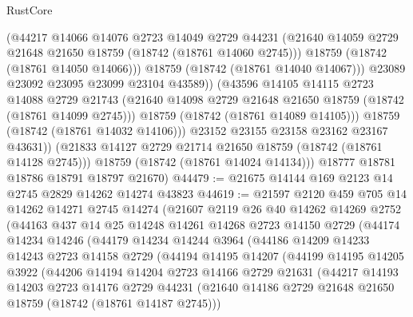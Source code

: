 \begin{lexlean}{RustCore}
\begin{coremodule}
                    (@44217
                      @14066
                      @14076
                      @2723
                      @14049
                      @2729
                      @44231
                      (@21640 @14059 @2729 @21648 @21650 @18759 (@18742 (@18761 @14060 @2745)))
                      @18759
                      (@18742 (@18761 @14050 @14066)))
                    @18759
                    (@18742 (@18761 @14040 @14067)))
                  @23089
                  @23092
                  @23095
                  @23099
                  @23104
                  @43589))
              (@43596
                @14105
                @14115
                @2723
                @14088
                @2729
                @21743
                (@21640 @14098 @2729 @21648 @21650 @18759 (@18742 (@18761 @14099 @2745)))
                @18759
                (@18742 (@18761 @14089 @14105)))
              @18759
              (@18742 (@18761 @14032 @14106)))
            @23152
            @23155
            @23158
            @23162
            @23167
            @43631))
        (@21833 @14127 @2729 @21714 @21650 @18759 (@18742 (@18761 @14128 @2745)))
        @18759
        (@18742 (@18761 @14024 @14134)))
      @18777
      @18781
      @18786
      @18791
      @18797
      @21670)
@44479 := @21675 @14144 @169 @2123 @14 @2745 @2829 @14262 @14274 @43823
@44619 := @21597
    @2120
    @459
    @705
    @14
    @14262
    @14271
    @2745
    @14274
    (@21607
      @2119
      @26
      @40
      @14262
      @14269
      @2752
      (@44163
        @437
        @14
        @25
        @14248
        @14261
        @14268
        @2723
        @14150
        @2729
        (@44174
          @14234
          @14246
          (@44179
            @14234
            @14244
            @3964
            (@44186
              @14209
              @14233
              @14243
              @2723
              @14158
              @2729
              (@44194
                @14195
                @14207
                (@44199
                  @14195
                  @14205
                  @3922
                  (@44206
                    @14194
                    @14204
                    @2723
                    @14166
                    @2729
                    @21631
                    (@44217
                      @14193
                      @14203
                      @2723
                      @14176
                      @2729
                      @44231
                      (@21640 @14186 @2729 @21648 @21650 @18759 (@18742 (@18761 @14187 @2745)))

\end{coremodule}
\end{lexlean}
